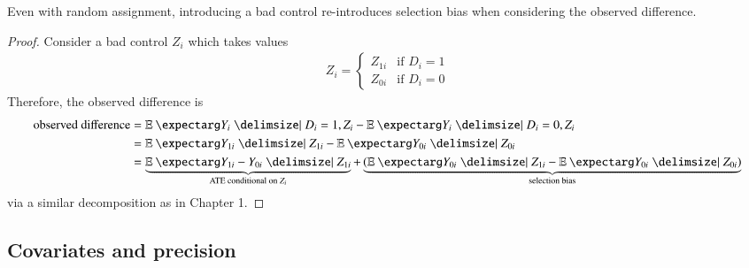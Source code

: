             \begin{theorem}
                Even with random assignment, introducing a bad control re-introduces selection bias when considering the observed difference.
            \end{theorem}
            \begin{proof}
                Consider a bad control $Z_i$ which takes values
                \begin{align}
                    Z_i =
                    \begin{cases}
                        Z_{1i}  &\text{if }D_i=1    \\
                        Z_{0i}  &\text{if }D_i=0
                    \end{cases}
                \end{align}
                Therefore, the observed difference is
                \begin{align}
                    \text{observed difference}
                        &= \expect{Y_{i}|D_i=1,Z_i} - \expect{Y_{i}|D_i=0,Z_i}  \\
                        &= \expect{Y_{1i}|Z_{1i}} - \expect{Y_{0i}|Z_{0i}}\\
                        &= \underbrace{\expect{Y_{1i} - Y_{0i}|Z_{1i}}}_{\text{ATE conditional on }Z_i} + \underbrace{\left(\expect{Y_{0i}|Z_{1i}} - \expect{Y_{0i}|Z_{0i}}\right)}_\text{selection bias}
                \end{align}
                via a similar decomposition as in Chapter 1.
            \end{proof}

        \subsection{Covariates and precision}
            

